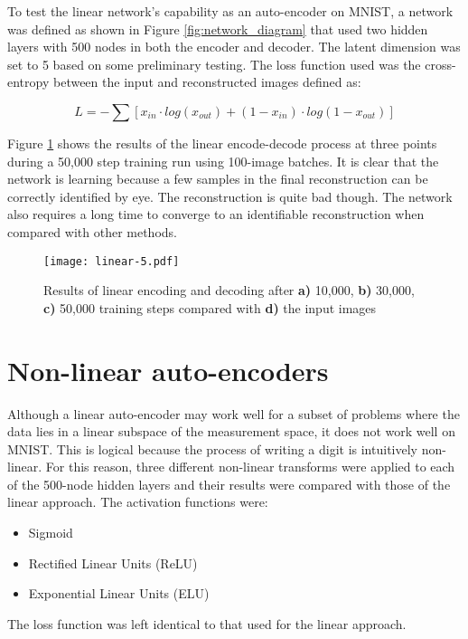 \documentclass{article}
\begin{document}
To test the linear network's capability as an auto-encoder on MNIST, a network was defined as shown in Figure \ref{fig:network_diagram} that used two hidden layers with 500 nodes in both the encoder and decoder. The latent dimension was set to 5 based on some preliminary testing. The loss function used was the cross-entropy between the input and reconstructed images defined as:

\begin{equation}
\label{eqn:cross_entropy}
L=-\sum\left[{x_{in}\cdot log(x_{out}) + (1-x_{in})\cdot log(1-x_{out})}\right]
\end{equation}

Figure \ref{fig:linear_reconstruction} shows the results of the linear encode-decode process at three points during a 50,000 step training run using 100-image batches. It is clear that the network is learning because a few samples in the final reconstruction can be correctly identified by eye. The reconstruction is quite bad though. The network also requires a long time to converge to an identifiable reconstruction when compared with other methods.


\begin{figure}[h]
\begin{center}
\texttt{[image: linear-5.pdf]} 
\caption{Results of linear encoding and decoding after \textbf{a)} 10,000, \textbf{b)} 30,000, \textbf{c)} 50,000 training steps compared with \textbf{d)} the input images}
\label{fig:linear_reconstruction}
\end{center}
\end{figure}

\section{Non-linear auto-encoders}
Although a linear auto-encoder may work well for a subset of problems where the data lies in a linear subspace of the measurement space, it does not work well on MNIST. This is logical because the process of writing a digit is intuitively non-linear. For this reason, three different non-linear transforms were applied to each of the 500-node hidden layers and their results were compared with those of the linear approach. The activation functions were:
\begin{itemize}
\item Sigmoid
\item Rectified Linear Units (ReLU)
\item Exponential Linear Units (ELU)
\end{itemize}
The loss function was left identical to that used for the linear approach. 
\end{document}
